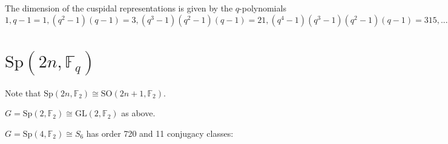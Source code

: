 \documentclass[11pt,oneside]{article}
\newcommand{\GL}{\mathrm{GL}}
\newcommand{\SO}{\mathrm{SO}}
\newcommand{\Sp}{\mathrm{Sp}}
\newcommand{\Field}{\mathbb{F}}
\begin{document}
The dimension of the cuspidal representations is given by the $q$-polynomials
$
1, q-1=1, 
(q^2-1)(q-1)=3, 
(q^3-1)(q^2-1)(q-1)=21, 
(q^4-1)(q^3-1)(q^2-1)(q-1)=315, ...
$



\section{$\Sp(2n,\Field_q)$}

% 

Note that $\Sp(2n,\Field_2) \cong \SO(2n+1,\Field_2)$.

$G=\Sp(2,\Field_2)\cong \GL(2,\Field_2)$ as above.

$G=\Sp(4,\Field_2)\cong S_6$ has order 720 and 11 conjugacy classes:
\end{document}
